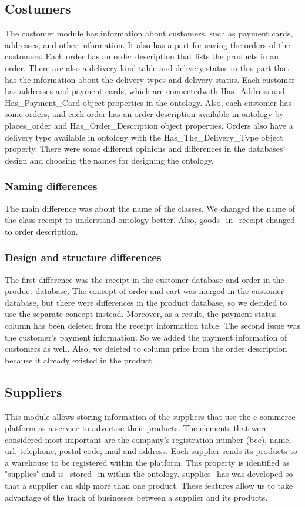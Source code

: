 \documentclass{article}
\begin{document}
\subsection{Costumers}
The customer module has information about customers, such as payment cards, addresses, and other information. It also has a part for saving the orders of the customers. Each order has an order description that lists the products in an order. There are also a delivery kind table and delivery status in this part that has the information about the delivery types and delivery status. Each customer has addresses and payment cards, which are connectedwith Has\_Address and Has\_Payment\_Card object properties in the ontology. Also, each customer has some orders, and each order has an order description available in ontology by places\_order and Has\_Order\_Description object properties. Orders also have a delivery type available in ontology with the Has\_The\_Delivery\_Type object property. There were some different opinions and differences in the databases' design and choosing the names for designing the ontology.

\subsubsection{Naming differences}
The main difference was about the name of the classes. We changed the name of the class receipt to understand ontology better. Also, goods\_in\_receipt changed to order description.

\subsubsection{Design and structure differences}
The first difference was the receipt in the customer database and order in the product database. The concept of order and cart was merged in the customer database, but there were differences in the product database, so we decided to use the separate concept instead. Moreover, as a result, the payment status column has been deleted from the receipt information table. The second issue was the customer's payment information. So we added the payment information of customers as well. Also, we deleted to column price from the order description because it already existed in the product.


\subsection{Suppliers}
This module allows storing information of the suppliers that use the e-commerce platform as a service to advertise their products. The elements that were considered most important are the company's registration number (bce), name, url, telephone, postal code, mail and address. Each supplier sends its products to a warehouse to be registered within the platform. This property is identified as "supplies" and is\_stored\_in within the ontology. supplies\_has was developed so that a supplier can ship more than one product. These features allow us to take advantage of the track of businesses between a supplier and its products.
\end{document}
